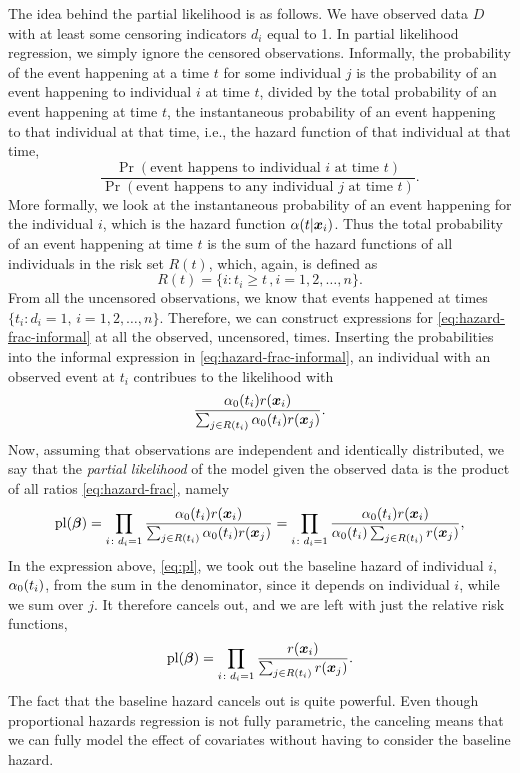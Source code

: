 The idea behind the partial likelihood is as follows.
We have observed data $D$ with at least some censoring indicators $d_i$ equal to 1. In partial likelihood regression, we simply ignore the censored observations.
Informally, the probability of the event happening at a time $t$ for some individual $j$ is the probability of an event happening to individual $i$ at
time $t$, divided by the total probability of an event happening at time $t$,
the instantaneous probability of an event happening to that individual at that time, i.e., the hazard function of that individual at that time,
\begin{equation}\label{eq:hazard-frac-informal}
    \frac{\Pr(\text{event happens to individual }i\text{ at time }t)}{\Pr(\text{event happens to any individual }j\text{ at time }t)}.
\end{equation}
More formally, we look at the instantaneous probability of an event happening for the individual $i$, which is the hazard function $\alpha(t|\bm{x}_i)$.
Thus the total probability of an event happening at time $t$ is the sum of the hazard functions of all individuals in the risk set
$R(t)$, which, again, is defined as
\begin{equation*}
    R(t)=\{i\colon t_i\geq t\,,i=1,2,\ldots,n\}.
\end{equation*}
From all the uncensored observations, we know that events happened at times $\{t_i\colon d_i=1,\,i=1,2,\ldots,n\}$. Therefore, we can construct expressions for \eqref{eq:hazard-frac-informal} at all the observed, uncensored, times.
Inserting the probabilities into the informal expression in \eqref{eq:hazard-frac-informal}, an individual with an observed event at $t_i$ 
contribues to the likelihood with
\begin{equation}\label{eq:hazard-frac}
    \frac{\alpha_0(t_i)r(\bm{x}_i)}{\sum_{j\in R(t_i)} \alpha_0(t_i)r(\bm{x}_j)}.
\end{equation}
Now, assuming that observations are independent and identically distributed, we say that the \textit{partial likelihood} of the model
given the observed data is the product of all ratios \eqref{eq:hazard-frac}, namely
\begin{equation}\label{eq:pl}
    \operatorname{pl}(\boldsymbol{\beta})=\prod_{i\colon d_i=1}\frac{\alpha_0(t_i)r(\bm{x}_i)}{\sum_{j\in R(t_i)} \alpha_0(t_i)r(\bm{x}_j)}=\prod_{i\colon d_i=1}\frac{\alpha_0(t_i)r(\bm{x}_i)}{\alpha_0(t_i)\sum_{j\in R(t_i)}r(\bm{x}_j)},
\end{equation}
In the expression above, \eqref{eq:pl}, we took out the baseline hazard of individual $i$, $\alpha_0(t_i)$, from the sum in the denominator, since it depends on individual $i$, while we sum over $j$.
It therefore cancels out, and we are left with just the relative risk functions,
\begin{equation*}
    \operatorname{pl}(\boldsymbol{\beta})=\prod_{i\colon d_i=1}\frac{r(\bm{x}_i)}{\sum_{j\in R(t_i)}r(\bm{x}_j)}.
\end{equation*}
The fact that the baseline hazard cancels out is quite powerful. Even though proportional hazards regression is not fully parametric,
the canceling means that we can fully model the effect of covariates without having to consider the baseline hazard.

